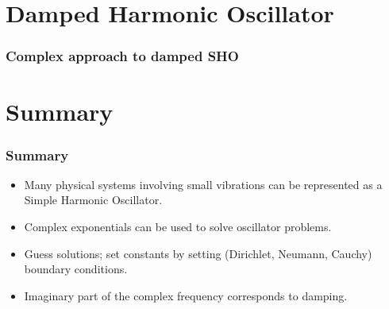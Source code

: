 \documentclass[pdf,hideothersubsections]{beamer}
\begin{document}
\section{Damped Harmonic Oscillator}
\begin{frame}
\frametitle{Complex approach to damped SHO}


\end{frame}

\section{Summary}
\begin{frame}
\frametitle{Summary}
\begin{itemize}
\item Many physical systems involving small vibrations can be represented as a Simple Harmonic Oscillator.
\item Complex exponentials can be used to solve oscillator problems.
\pause
\item Guess solutions; set constants by setting (Dirichlet, Neumann, Cauchy) boundary conditions.
\pause
\item Imaginary part of the complex frequency corresponds to damping.
\end{itemize}
\end{frame}
\end{document}
